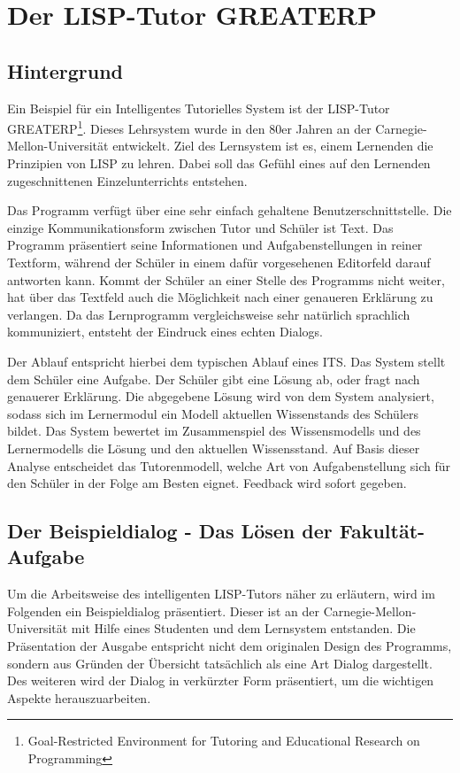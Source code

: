 \chapter{Der LISP-Tutor GREATERP}

\section{Hintergrund}
Ein Beispiel für ein Intelligentes Tutorielles System ist der LISP-Tutor GREATERP\footnote{Goal-Restricted Environment for Tutoring and Educational Research on Programming}.
Dieses Lehrsystem wurde in den 80er Jahren an der Carnegie-Mellon-Universität entwickelt.
Ziel des Lernsystem ist es, einem Lernenden die Prinzipien von LISP zu lehren. Dabei soll das
Gefühl eines auf den Lernenden zugeschnittenen Einzelunterrichts entstehen.\cite[S. 159]{anderson1985}

Das Programm verfügt über eine sehr einfach gehaltene Benutzerschnittstelle.
Die einzige Kommunikationsform zwischen Tutor und Schüler ist Text.
Das Programm präsentiert seine Informationen und Aufgabenstellungen in reiner Textform,
während der Schüler in einem dafür vorgesehenen Editorfeld darauf antworten kann.
Kommt der Schüler an einer Stelle des Programms nicht weiter, hat über das Textfeld auch die Möglichkeit
nach einer genaueren Erklärung zu verlangen.
Da das Lernprogramm vergleichsweise sehr natürlich sprachlich kommuniziert, entsteht der
Eindruck eines echten Dialogs.

Der Ablauf entspricht hierbei dem typischen Ablauf eines ITS.
Das System stellt dem Schüler eine Aufgabe. Der Schüler gibt eine Lösung ab, oder fragt nach genauerer Erklärung.
Die abgegebene Lösung wird von dem System analysiert, sodass sich im Lernermodul ein Modell aktuellen Wissenstands des Schülers bildet.
Das System bewertet im Zusammenspiel des Wissensmodells und des Lernermodells die Lösung und den aktuellen Wissensstand.
Auf Basis dieser Analyse entscheidet das Tutorenmodell, welche Art von Aufgabenstellung sich für den Schüler in der Folge am Besten eignet.
Feedback wird sofort gegeben.\cite[S. 160f]{anderson1985}

\section{Der Beispieldialog - Das Lösen der Fakultät-Aufgabe}
Um die Arbeitsweise des intelligenten LISP-Tutors näher zu erläutern,
wird im Folgenden ein Beispieldialog präsentiert. Dieser ist an der
Carnegie-Mellon-Universität mit Hilfe eines Studenten und dem Lernsystem entstanden.
Die Präsentation der Ausgabe entspricht nicht dem originalen Design des Programms,
sondern aus Gründen der Übersicht tatsächlich als eine Art Dialog dargestellt.
Des weiteren wird der Dialog in verkürzter Form präsentiert, um die wichtigen Aspekte
herauszuarbeiten.
\newpage

